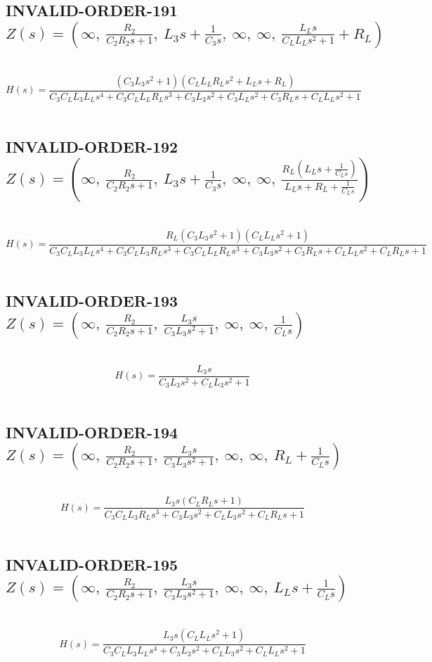 \documentclass{article}
\begin{document}
\subsection{INVALID-ORDER-191 $Z(s) = \left( \infty, \  \frac{R_{2}}{C_{2} R_{2} s + 1}, \  L_{3} s + \frac{1}{C_{3} s}, \  \infty, \  \infty, \  \frac{L_{L} s}{C_{L} L_{L} s^{2} + 1} + R_{L}\right)$ } \ 
\textbf{\[H(s) = \frac{\left(C_{3} L_{3} s^{2} + 1\right) \left(C_{L} L_{L} R_{L} s^{2} + L_{L} s + R_{L}\right)}{C_{3} C_{L} L_{3} L_{L} s^{4} + C_{3} C_{L} L_{L} R_{L} s^{3} + C_{3} L_{3} s^{2} + C_{3} L_{L} s^{2} + C_{3} R_{L} s + C_{L} L_{L} s^{2} + 1}\] } \ 
\subsection{INVALID-ORDER-192 $Z(s) = \left( \infty, \  \frac{R_{2}}{C_{2} R_{2} s + 1}, \  L_{3} s + \frac{1}{C_{3} s}, \  \infty, \  \infty, \  \frac{R_{L} \left(L_{L} s + \frac{1}{C_{L} s}\right)}{L_{L} s + R_{L} + \frac{1}{C_{L} s}}\right)$ } \ 
\textbf{\[H(s) = \frac{R_{L} \left(C_{3} L_{3} s^{2} + 1\right) \left(C_{L} L_{L} s^{2} + 1\right)}{C_{3} C_{L} L_{3} L_{L} s^{4} + C_{3} C_{L} L_{3} R_{L} s^{3} + C_{3} C_{L} L_{L} R_{L} s^{3} + C_{3} L_{3} s^{2} + C_{3} R_{L} s + C_{L} L_{L} s^{2} + C_{L} R_{L} s + 1}\] } \ 
\subsection{INVALID-ORDER-193 $Z(s) = \left( \infty, \  \frac{R_{2}}{C_{2} R_{2} s + 1}, \  \frac{L_{3} s}{C_{3} L_{3} s^{2} + 1}, \  \infty, \  \infty, \  \frac{1}{C_{L} s}\right)$ } \ 
\textbf{\[H(s) = \frac{L_{3} s}{C_{3} L_{3} s^{2} + C_{L} L_{3} s^{2} + 1}\] } \ 
\subsection{INVALID-ORDER-194 $Z(s) = \left( \infty, \  \frac{R_{2}}{C_{2} R_{2} s + 1}, \  \frac{L_{3} s}{C_{3} L_{3} s^{2} + 1}, \  \infty, \  \infty, \  R_{L} + \frac{1}{C_{L} s}\right)$ } \ 
\textbf{\[H(s) = \frac{L_{3} s \left(C_{L} R_{L} s + 1\right)}{C_{3} C_{L} L_{3} R_{L} s^{3} + C_{3} L_{3} s^{2} + C_{L} L_{3} s^{2} + C_{L} R_{L} s + 1}\] } \ 
\subsection{INVALID-ORDER-195 $Z(s) = \left( \infty, \  \frac{R_{2}}{C_{2} R_{2} s + 1}, \  \frac{L_{3} s}{C_{3} L_{3} s^{2} + 1}, \  \infty, \  \infty, \  L_{L} s + \frac{1}{C_{L} s}\right)$ } \ 
\textbf{\[H(s) = \frac{L_{3} s \left(C_{L} L_{L} s^{2} + 1\right)}{C_{3} C_{L} L_{3} L_{L} s^{4} + C_{3} L_{3} s^{2} + C_{L} L_{3} s^{2} + C_{L} L_{L} s^{2} + 1}\] } \ 
\end{document}
